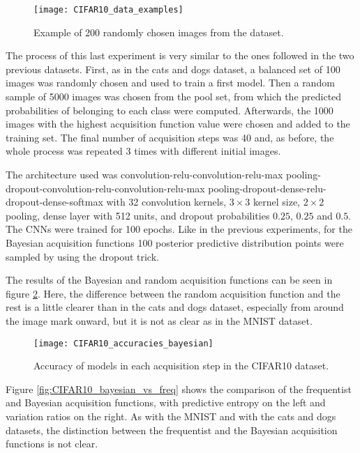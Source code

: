 \begin{figure}[H]
    \centering
    \texttt{[image: CIFAR10\_data\_examples]}
    \caption{Example of 200 randomly chosen images from the dataset.}
    \label{fig:CIFAR10_data_examples}
\end{figure}

The process of this last experiment is very similar to the ones followed in the two previous datasets. First, as in the cats and dogs dataset, a balanced set of 100 images was randomly chosen and used to train a first model. Then a random sample of 5000 images was chosen from the pool set, from which the predicted probabilities of belonging to each class were computed. Afterwards, the 1000 images with the highest acquisition function value were chosen and added to the training set. The final number of acquisition steps was 40 and, as before, the whole process was repeated 3 times with different initial images.

The architecture used was convolution-relu-convolution-relu-max pooling-dropout-convolution-relu-convolution-relu-max pooling-dropout-dense-relu-dropout-dense-softmax with 32 convolution kernels, $3 \times 3$ kernel size, $2 \times 2$ pooling, dense layer with 512 units, and dropout probabilities $0.25$, $0.25$ and $0.5$. The CNNs were trained for 100 epochs. Like in the previous experiments, for the Bayesian acquisition functions 100 posterior predictive distribution points were sampled by using the dropout trick.

The results of the Bayesian and random acquisition functions can be seen in figure \ref{fig:CIFAR10_accuracies_bayesian}. Here, the difference between the random acquisition function and the rest is a little clearer than in the cats and dogs dataset, especially from around the  image mark onward, but it is not as clear as in the MNIST dataset.

\begin{figure}[H]
    \centering
    \texttt{[image: CIFAR10\_accuracies\_bayesian]}
    \caption{Accuracy of models in each acquisition step in the CIFAR10 dataset.}
    \label{fig:CIFAR10_accuracies_bayesian}
\end{figure}

Figure \ref{fig:CIFAR10_bayesian_vs_freq} shows the comparison of the frequentist and Bayesian acquisition functions, with predictive entropy on the left and variation ratios on the right. As with the MNIST and with the cats and dogs datasets, the distinction between the frequentist and the Bayesian acquisition functions is not clear.

